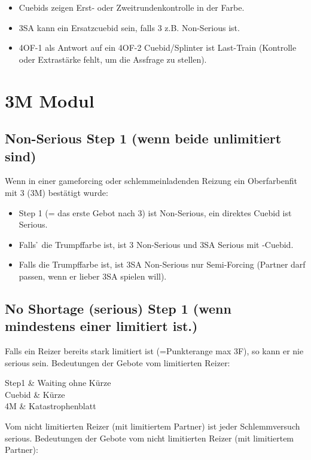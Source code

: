 \begin{itemize}
	\item Cuebids zeigen Erst- oder Zweitrundenkontrolle in der Farbe.
	\item 3SA kann ein Ersatzcuebid sein, falls 3\s{} z.B. Non-Serious ist.
	\item 4OF-1 als Antwort auf ein 4OF-2 Cuebid/Splinter ist Last-Train (Kontrolle oder Extrastärke fehlt, um die Assfrage zu stellen).
\end{itemize}

\section{3M Modul} \label{sec:3M Modul}

\subsection{Non-Serious Step 1 (wenn beide unlimitiert sind)}

Wenn in einer gameforcing oder schlemmeinladenden Reizung ein Oberfarbenfit mit 3\M{} (3M) bestätigt wurde:

\begin{itemize}
	\item Step 1 (= das erste Gebot nach 3\M) ist Non-Serious, ein direktes Cuebid ist Serious.
	\item Falls \h{} die Trumpffarbe ist, ist 3\s\ra{} Non-Serious und 3SA\ra{} Serious mit \s-Cuebid.
	\item Falls \s{} die Trumpffarbe ist, ist 3SA\ra{} Non-Serious nur Semi-Forcing (Partner darf passen, wenn er lieber 3SA spielen will).
\end{itemize}

\subsection{No Shortage (serious) Step 1 (wenn mindestens einer limitiert ist.)}

Falls ein Reizer bereits stark limitiert ist (=Punkterange max 3F), so kann er nie serious sein.
Bedeutungen der Gebote vom limitierten Reizer:

\begin{bids}
	Step1   & Waiting ohne Kürze \\
	Cuebid  & Kürze \\
	4M      & Katastrophenblatt
\end{bids}

Vom nicht limitierten Reizer (mit limitiertem Partner) ist jeder Schlemmversuch serious.
Bedeutungen der Gebote vom nicht limitierten Reizer (mit limitiertem Partner):

